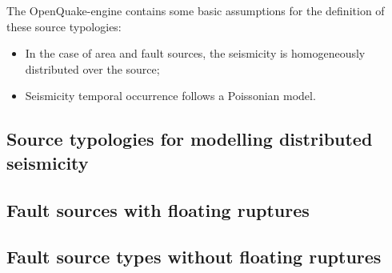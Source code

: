 The OpenQuake-engine contains some basic assumptions for the definition of
these source typologies:

\begin{itemize}

    \item In the case of area and fault sources, the seismicity is
    homogeneously distributed over the source;

    \item Seismicity temporal occurrence follows a Poissonian model.

\end{itemize}



\subsection{Source typologies for modelling distributed seismicity}


\subsection{Fault sources with floating ruptures}


\subsection{Fault source types without floating ruptures}

